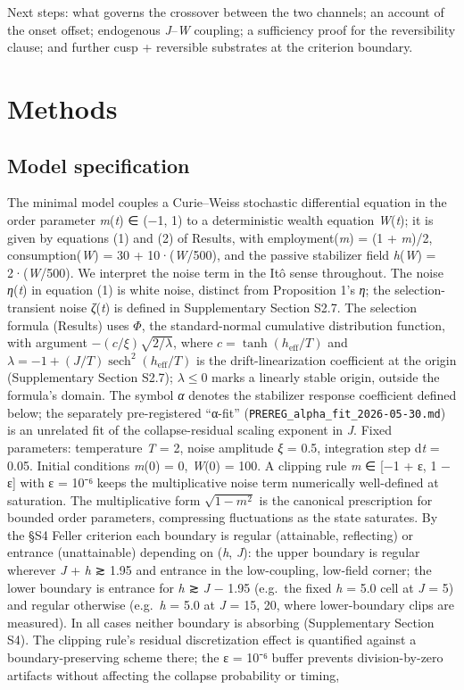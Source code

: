 \documentclass[11pt,letterpaper]{article}
\begin{document}
Next steps: what governs the crossover between the two channels; an account of the onset offset; endogenous \emph{J}--\emph{W} coupling; a sufficiency proof for the reversibility clause; and further cusp + reversible substrates at the criterion boundary.

\section{Methods}\label{methods}

\subsection{Model specification}\label{model-specification}

The minimal model couples a Curie--Weiss stochastic differential equation in the order parameter \emph{m}(\emph{t}) ∈ (−1, 1) to a deterministic wealth equation \emph{W}(\emph{t}); it is given by equations (1) and (2) of Results, with employment(\emph{m}) = (1 + \emph{m})/2, consumption(\emph{W}) = 30 + 10·(\emph{W}/500), and the passive stabilizer field \emph{h}(\emph{W}) = 2·(\emph{W}/500). We interpret the noise term in the Itô sense throughout. The noise \emph{η}(\emph{t}) in equation (1) is white noise, distinct from Proposition 1's \emph{η}; the selection-transient noise \emph{ζ}(\emph{t}) is defined in Supplementary Section S2.7. The selection formula (Results) uses \(\Phi\), the standard-normal cumulative distribution function, with argument \(-(c/\xi)\sqrt{2/\lambda}\), where \(c = \tanh(h_{\mathrm{eff}}/T)\) and \(\lambda = -1 + (J/T)\operatorname{sech}^2(h_{\mathrm{eff}}/T)\) is the drift-linearization coefficient at the origin (Supplementary Section S2.7); \(\lambda \le 0\) marks a linearly stable origin, outside the formula's domain. The symbol \emph{α} denotes the stabilizer response coefficient defined below; the separately pre-registered ``α-fit'' (\texttt{PREREG\_alpha\_fit\_2026-05-30.md}) is an unrelated fit of the collapse-residual scaling exponent in \emph{J}. Fixed parameters: temperature \emph{T} = 2, noise amplitude \emph{ξ} = 0.5, integration step d\emph{t} = 0.05. Initial conditions \emph{m}(0) = 0, \emph{W}(0) = 100. A clipping rule \emph{m} ∈ {[}−1 + ε, 1 − ε{]} with ε = 10⁻⁶ keeps the multiplicative noise term numerically well-defined at saturation. The multiplicative form \(\sqrt{1-m^2}\) is the canonical prescription for bounded order parameters, compressing fluctuations as the state saturates. By the §S4 Feller criterion each boundary is regular (attainable, reflecting) or entrance (unattainable) depending on (\emph{h}, \emph{J}): the upper boundary is regular wherever \emph{J} + \emph{h} ≳ 1.95 and entrance in the low-coupling, low-field corner; the lower boundary is entrance for \emph{h} ≳ \emph{J} − 1.95 (e.g.~the fixed \emph{h} = 5.0 cell at \emph{J} = 5) and regular otherwise (e.g.~\emph{h} = 5.0 at \emph{J} = 15, 20, where lower-boundary clips are measured). In all cases neither boundary is absorbing (Supplementary Section S4). The clipping rule's residual discretization effect is quantified against a boundary-preserving scheme there; the ε = 10⁻⁶ buffer prevents division-by-zero artifacts without affecting the collapse probability or timing, 
\end{document}
